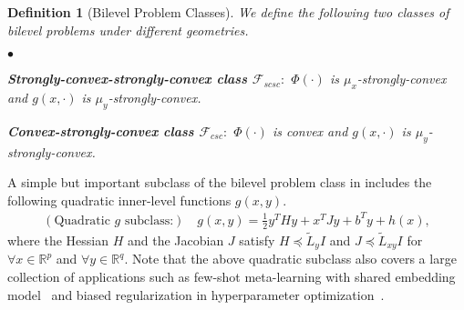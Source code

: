 \documentclass{osudissert96}
\DeclareMathOperator*{\argmin}{arg\,min}
\newtheorem{definition}{Definition}
\begin{document}
\begin{definition}[Bilevel Problem Classes]
We define the following two classes of bilevel problems under different geometries.     
\begin{list}{$\bullet$}{\topsep=0.1in \leftmargin=0.15in \rightmargin=0.1in \itemsep =0.01in}
\item {\bf Strongly-convex-strongly-convex class $\mathcal{F}_{scsc}:$}  $\Phi(\cdot)$ is $\mu_x$-strongly-convex and $g(x,\cdot)$ is $\mu_y$-strongly-convex. 
\item {\bf Convex-strongly-convex class $\mathcal{F}_{csc}:$}  $\Phi(\cdot)$ is convex and $g(x,\cdot)$ is $\mu_y$-strongly-convex. %
\end{list}
\end{definition}
A simple but important subclass of the bilevel problem class in  includes the following quadratic inner-level functions $g(x,y)$.
%
\begin{align}\label{quadratic_case}
(\text{Quadratic $g$ subclass:}) \quad g(x,y) = \frac{1}{2} y^T H y +  x^T J y +b^Ty + h(x),   
\end{align}
where the Hessian $H$ and the Jacobian $J$ satisfy $ H \preceq \widetilde L_{y} I$ and $J \preceq \widetilde L_{xy} I$ for $\forall x\in\mathbb{R}^p$ and $\forall y\in\mathbb{R}^q$. 
Note that the above quadratic subclass also covers a large collection of applications such as few-shot meta-learning with shared embedding model~\cite{bertinetto2018meta} and biased regularization in hyperparameter optimization~\cite{grazzi2020iteration}. 
\end{document}
